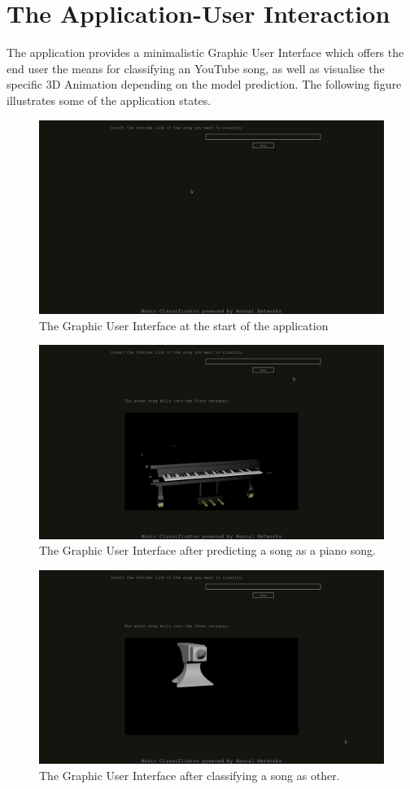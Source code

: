 \section{The Application-User Interaction}
	The application provides a minimalistic Graphic User Interface which offers the end user the means for
	classifying an YouTube song, as well as visualise the specific 3D Animation depending on the model prediction.
	The following figure illustrates some of the application states.


			\begin{figure}[H]
				\centering
				\includegraphics[width = 5.5in]{images/basic_interface.png}
				\caption{The Graphic User Interface at the start of the application}
			\label{guis}
			\end{figure}

			\begin{figure}[H]
				\centering
				\includegraphics[width = 5.5in]{images/piano.png}
				\caption{The Graphic User Interface after predicting a song as a piano song.}
			\label{guip}
			\end{figure}

			\begin{figure}[H]
				\centering
				\includegraphics[width = 5.5in]{images/other.png}
				\caption{The Graphic User Interface after classifying a song as other.}
			\label{guio}
			\end{figure}
